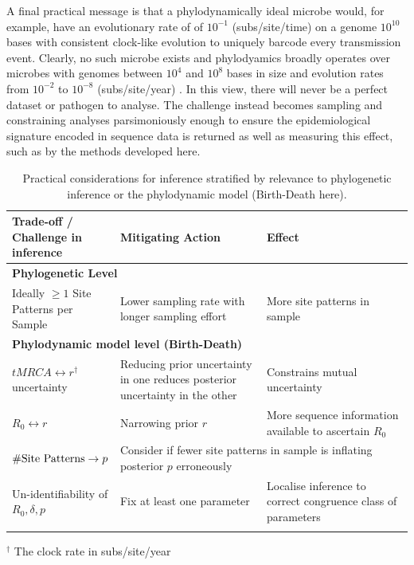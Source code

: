\documentclass{article}
\begin{document}
A final practical message is that a phylodynamically ideal microbe would, for example, have an evolutionary rate of of $10^{-1}$ (subs/site/time) on a genome $10^{10}$ bases with consistent clock-like evolution to uniquely barcode every transmission event. Clearly, no such microbe exists and phylodyamics broadly operates over microbes with genomes between $10^4$ and $10^8$ bases in size and evolution rates from $10^{-2}$ to $10^{-8}$ (subs/site/year) \citep{Biek2015Mesurably}. In this view, there will never be a perfect dataset or pathogen to analyse. The challenge instead becomes sampling and constraining analyses parsimoniously enough to ensure the epidemiological signature encoded in sequence data is returned as well as measuring this effect, such as by the methods developed here.

\begin{table}[H]
\centering
\caption{Practical considerations for inference stratified by relevance to phylogenetic inference or the phylodynamic model (Birth-Death here).}
\begin{tabular}{p{0.25\linewidth} p{0.375\linewidth} p{0.375\linewidth}} 
\midrule
Trade-off / Challenge in inference & 
Mitigating Action &
Effect\\
\midrule
\multicolumn{3}{l}{\textbf{Phylogenetic Level}}\\

\midrule
Ideally $\geq1$ Site Patterns per Sample &
Lower sampling rate with longer sampling effort &
More site patterns in sample\\[0.25cm]

\midrule
\multicolumn{3}{l}{\textbf{Phylodynamic model level (Birth-Death)}}\\   

\midrule
$tMRCA \leftrightarrow r^\dagger$ uncertainty & 
Reducing prior uncertainty in one reduces posterior uncertainty in the other &
Constrains mutual uncertainty \\[0.25cm]

$R_0 \leftrightarrow r$ &
Narrowing prior $r$ &
More sequence information available to ascertain $R_0$\\[0.25cm]

$\textnormal{\#Site Patterns} \rightarrow p$ &
\multicolumn{2}{l}{Consider if fewer site patterns in sample is inflating posterior $p$ erroneously}\\[0.25cm]

Un-identifiability of $R_{0}, \delta, p$ &
Fix at least one parameter \citep{louca2021fundamental} &
Localise inference to correct congruence class of parameters\\
\bottomrule 
\label{tab:pracRec}
\end{tabular}
\end{table}
\footnotesize{$^\dagger$ The clock rate in subs/site/year}
\end{document}
